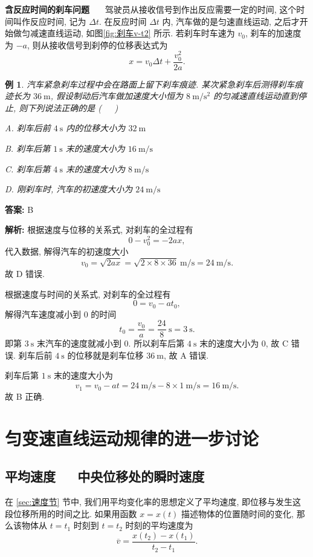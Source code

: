\documentclass[UTF8,openany,fontset=fandol]{ctexbook}
\theoremstyle{chinesetextbook}
\newtheorem{example}{例}[chapter]
\newcommand{\bre}{\ \ \ }
\newcommand{\unit}[1]{\ \mathrm{#1}}
\begin{document}
\textbf{含反应时间的刹车问题} \bre 驾驶员从接收信号到作出反应需要一定的时间, 这个时间叫作反应时间, 记为 $\Delta t$. 在反应时间 $\Delta t$ 内, 汽车做的是匀速直线运动, 之后才开始做匀减速直线运动, 如图\ref{fig:刹车v-t2} 所示. 若刹车时车速为 $v_0$, 刹车的加速度为 $-a$, 则从接收信号到刹停的位移表达式为
\[
x=v_0\Delta t+\frac{v_0^2}{2a}.
\]
\begin{example}
汽车紧急刹车过程中会在路面上留下刹车痕迹. 某次紧急刹车后测得刹车痕迹长为 $36\unit{m}$, 假设制动后汽车做加速度大小恒为 $8\unit{m/s^2}$ 的匀减速直线运动直到停止, 则下列说法正确的是 (\bre)

A. 刹车后前 $4\unit{s}$ 内的位移大小为 $32\unit{m}$

B. 刹车后第 $1\unit{s}$ 末的速度大小为 $16\unit{m/s}$

C. 刹车后第 $4\unit{s}$ 末的速度大小为 $8\unit{m/s}$

D. 刚刹车时, 汽车的初速度大小为 $24\unit{m/s}$
\end{example}
\par\indent\textbf{答案:} B

\par\indent\textbf{解析:} 根据速度与位移的关系式, 对刹车的全过程有
\[
0-v_0^2=-2ax,
\]
代入数据, 解得汽车的初速度大小
\[
v_0=\sqrt{2ax}=\sqrt{2\times 8\times 36}\unit{m/s}=24\unit{m/s}.
\]
故 D 错误.

根据速度与时间的关系式, 对刹车的全过程有
\[
0=v_0-at_0,
\]
解得汽车速度减小到 0 的时间
\[
t_0=\frac{v_0}{a}=\frac{24}{8}\unit{s}=3\unit{s}.
\]
即第 $3\unit{s}$ 末汽车的速度就减小到 0. 所以刹车后第 $4\unit{s}$ 末的速度大小为 0, 故 C 错误. 刹车后前 $4\unit{s}$ 的位移就是刹车位移 $36\unit{m}$, 故 A 错误.

刹车后第 $1\unit{s}$ 末的速度大小为
\[
v_1=v_0-at=24\unit{m/s}-8\times 1\unit{m/s}=16\unit{m/s}.
\]
故 B 正确.
\section{匀变速直线运动规律的进一步讨论}
\subsection{平均速度\bre 中央位移处的瞬时速度}
在 \ref{sec:速度节} 节中, 我们用平均变化率的思想定义了平均速度, 即位移与发生这段位移所用的时间之比. 如果用函数 $x=x(t)$ 描述物体的位置随时间的变化, 那么该物体从 $t=t_1$ 时刻到 $t=t_2$ 时刻的平均速度为
\begin{equation}\label{eq:平均速度}
\overline{v}=\frac{x(t_2)-x(t_1)}{t_2-t_1}.
\end{equation}
\end{document}
